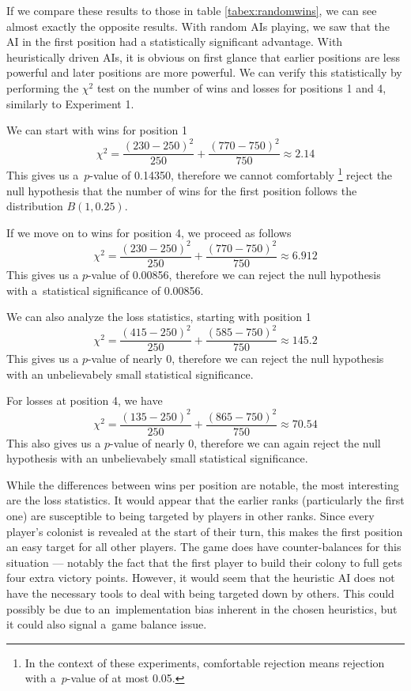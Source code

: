 If we compare these results to those in table \ref{tabex:randomwins}, we can see
almost exactly the opposite results. With random AIs playing, we saw that the AI
in the first position had a statistically significant advantage. With heuristically
driven AIs, it is obvious on first glance that earlier positions are less powerful
and later positions are more powerful. We can verify this statistically by performing
the $\chi^{2}$ test on the number of wins and losses for positions 1 and 4, similarly
to Experiment 1.

We can start with wins for position 1
$$\chi^{2} = \frac{(230 - 250)^{2}}{250} + \frac{(770 - 750)^{2}}{750} \approx 2.14$$
This gives us a~$p$-value of 0.14350, therefore we cannot comfortably
\footnote{In the context of these experiments, comfortable rejection means rejection
with a~$p$-value of at most 0.05.}
reject the null hypothesis that the number of wins for the first position
follows the distribution $B(1,0.25)$.

If we move on to wins for position 4, we proceed as follows
$$\chi^{2} = \frac{(230 - 250)^{2}}{250} + \frac{(770 - 750)^{2}}{750} \approx 6.912$$
This gives us a $p$-value of 0.00856, therefore we can reject the null hypothesis
with a~statistical significance of 0.00856.

We can also analyze the loss statistics, starting with position 1
$$\chi^{2} = \frac{(415 - 250)^{2}}{250} + \frac{(585 - 750)^{2}}{750} \approx 145.2$$
This gives us a $p$-value of nearly 0, therefore we can reject the null hypothesis
with an unbelievabely small statistical significance.

For losses at position 4, we have
$$\chi^{2} = \frac{(135 - 250)^{2}}{250} + \frac{(865 - 750)^{2}}{750} \approx 70.54$$
This also gives us a $p$-value of nearly 0, therefore we can again reject the null hypothesis
with an unbelievabely small statistical significance.

While the differences between wins per position are notable, the most interesting
are the loss statistics. It would appear that the earlier ranks (particularly the first one)
are susceptible to being targeted by players in other ranks. Since every player's colonist
is revealed at the start of their turn, this makes the first position an easy target
for all other players. The game does have counter-balances for this situation ---
notably the fact that the first player to build their colony to full gets four extra
victory points. However, it would seem that the heuristic AI does not have the necessary
tools to deal with being targeted down by others. This could possibly be due to
an~implementation bias inherent in the chosen heuristics, but it could also signal
a~game balance issue.

